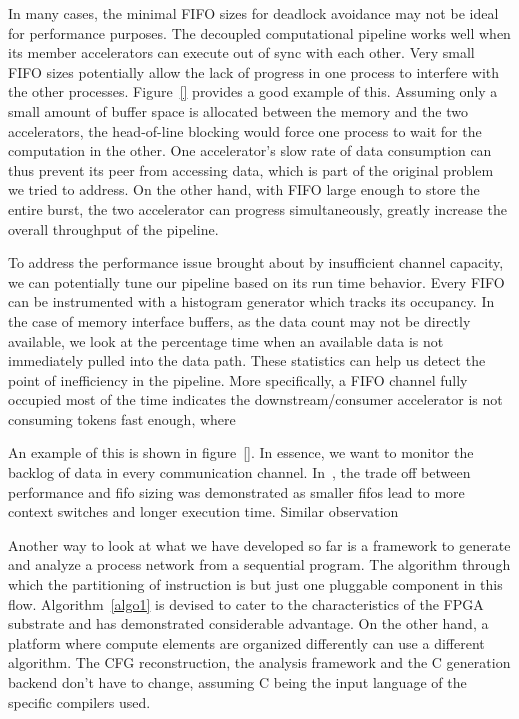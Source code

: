 In many cases, the minimal FIFO sizes for deadlock avoidance may not be ideal for performance purposes. The decoupled computational pipeline works well when its member accelerators
can execute out of sync with each other. Very small FIFO sizes potentially allow the lack of progress in one process to interfere with the other processes. 
Figure~\ref{} provides a good example of this. Assuming only a small amount of buffer space is allocated between the memory and the two accelerators, the head-of-line blocking would force one process to wait for the computation in the other. 
One accelerator's slow rate of data consumption can thus 
prevent its peer from accessing data, which is part of the original problem we tried to address.
On the other hand, with FIFO large enough to store the entire burst, the two accelerator
can progress simultaneously, greatly increase the overall throughput of the pipeline.

To address the performance issue brought about by insufficient channel capacity, we can potentially tune our pipeline based on its run time behavior. 
Every 
FIFO can be instrumented with a histogram generator
which tracks its occupancy. 
In the case of 
memory interface buffers, as the data count may not be directly available, we look at the percentage time when an available data is not immediately pulled into the data path. These statistics can help us detect the
point of inefficiency in the pipeline. More specifically, a FIFO channel fully occupied most of
the time indicates the downstream/consumer accelerator
is not consuming tokens fast enough, where


An example of this is shown in figure~\ref{}. In essence, we want to monitor the backlog of data
in every communication channel. 
In~\cite{}, the trade off between performance and fifo sizing was demonstrated as smaller fifos lead to more context switches and longer execution time. Similar observation 

Another way to look at what we have developed so far is a framework to generate and analyze a process network from a sequential program. The algorithm through which
the partitioning of instruction is but just one pluggable component in this flow.
Algorithm~\ref{algo1} is devised to cater to the characteristics of the FPGA substrate and has demonstrated considerable advantage. On the other hand, a platform
where compute elements are organized differently can use a different algorithm.
The CFG reconstruction, the analysis framework and the C generation backend don't 
have to change, assuming C being the input language of the specific compilers used.

